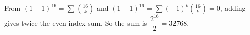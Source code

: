 From $(1+1)^{16}=\sum\binom{16}k$ and $(1-1)^{16}=\sum(-1)^k\binom{16}k=0$, adding gives twice the even-index sum. So the sum is $\dfrac{2^{16}}2=\boxed{32768}$.
